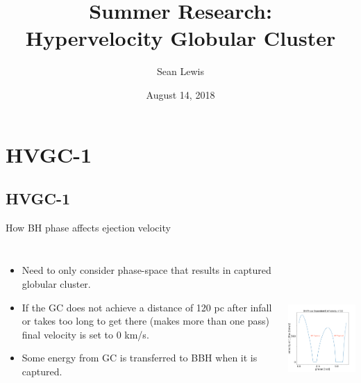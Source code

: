 \documentclass[aspectratio=169]{beamer}
\author[S.~Lewis]{Sean Lewis}
\date[2018-14-08]{August 14, 2018}
\title[Progress Report]{\Huge Summer Research: \\ Hypervelocity Globular Cluster}
\institute{Drexel University}
\begin{document}
\begin{frame}
  \maketitle
\end{frame}

\section{HVGC-1}
\subsection{HVGC-1}

\begin{frame}
  {How BH phase affects ejection velocity}
  \begin{columns}
    \begin{itemize}
      \item Need to only consider phase-space that results in captured globular cluster. 
      \item If the GC does not achieve a distance of 120 pc after infall or takes too long to get there (makes more than one pass) final velocity is set to 0 km/s.
      \item Some energy from GC is transferred to BBH when it is captured.
    \end{itemize}
    \includegraphics[width=6.4cm, height=6.4cm]{./Images/phase_loop_curated.png}
    \centering
  \end{columns}
\end{frame}
\end{document}
